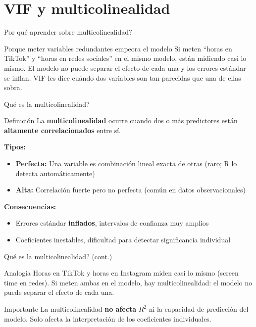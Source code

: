 \documentclass[aspectratio=169, 11pt]{beamer}
\begin{document}
\section{VIF y multicolinealidad}

\begin{frame}{\textquestiondown{}Por qu\'e aprender sobre multicolinealidad?}
\begin{exampleblock}{Porque meter variables redundantes empeora el modelo}
\small
Si meten ``horas en TikTok'' y ``horas en redes sociales'' en el mismo modelo, est\'an midiendo casi lo mismo. El modelo no puede separar el efecto de cada una y los errores est\'andar se inflan. VIF les dice cu\'ando dos variables son tan parecidas que una de ellas sobra.
\end{exampleblock}
\end{frame}

\begin{frame}{\textquestiondown Qu\'e es la multicolinealidad?}
\begin{block}{Definici\'on}
La \textbf{multicolinealidad} ocurre cuando dos o m\'as predictores est\'an \textbf{altamente correlacionados} entre s\'i.
\end{block}

\vspace{0.1cm}
\textbf{Tipos:}
\begin{itemize}
  \item \textbf{Perfecta:} Una variable es combinaci\'on lineal exacta de otras (raro; R lo detecta autom\'aticamente)
  \item \textbf{Alta:} Correlaci\'on fuerte pero no perfecta (com\'un en datos observacionales)
\end{itemize}

\vspace{0.1cm}
\textbf{Consecuencias:}
\begin{itemize}
  \item Errores est\'andar \textbf{inflados}, intervalos de confianza muy amplios
  \item Coeficientes inestables, dificultad para detectar significancia individual
\end{itemize}
\end{frame}

\begin{frame}{\textquestiondown Qu\'e es la multicolinealidad? (cont.)}
\begin{exampleblock}{Analog\'ia}
Horas en TikTok y horas en Instagram miden casi lo mismo (screen time en redes). Si meten ambas en el modelo, hay multicolinealidad: el modelo no puede separar el efecto de cada una.
\end{exampleblock}

\vspace{0.3cm}
\begin{alertblock}{Importante}
La multicolinealidad \textbf{no afecta} $R^2$ ni la capacidad de predicci\'on del modelo. Solo afecta la interpretaci\'on de los coeficientes individuales.
\end{alertblock}
\end{frame}
\end{document}
